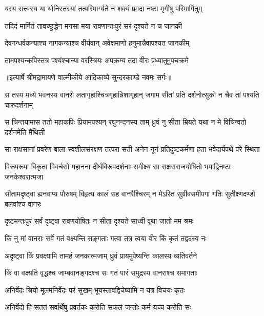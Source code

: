 \twolineshloka
{यस्य सत्त्वस्य या योनिस्तस्यां तत्परिमार्ग्यते}
{न शक्यं प्रमदा नष्टा मृगीषु परिमार्गितुम्} %

\twolineshloka
{तदिदं मार्गितं तावच्छुद्धेन मनसा मया}
{रावणान्तःपुरं सरं दृश्यते न च जानकी} %

\twolineshloka
{देवगन्धर्वकन्याश्च नागकन्याश्च वीर्यवान्}
{अवेक्षमाणो हनुमान्नैवापश्यत जानकीम्} %

\twolineshloka
{तामपश्यन्कपिस्तत्र पश्यंश्चान्या वरस्त्रियः}
{अपक्रम्य तदा वीरः प्रध्यातुमुपचक्रमे} %


{॥इत्यार्षे श्रीमद्रामायणे वाल्मीकीये आदिकाव्ये सुन्दरकाण्डे नवमः सर्गः॥}


\fourlineindentedshloka
{स तस्य मध्ये भवनस्य वानरो}
{लतागृहांश्चित्रगृहान्निशागृहान्}
{जगाम सीतां प्रति दर्शनोत्सुको}
{न चैव तां पश्यति चारुदर्शनाम्} %

\fourlineindentedshloka
{स चिन्तयामास ततो महाकपिः}
{प्रियामपश्यन् रघुनन्दनस्य ताम्}
{ध्रुवं नु सीता म्रियते यथा न मे}
{विचिन्वतो दर्शनमेति मैथिली} %

\fourlineindentedshloka
{सा राक्षसानां प्रवरेण बाला}
{स्वशीलसंरक्षण तत्परा सती}
{अनेन नूनं प्रतिदुष्टकर्मणा}
{हता भवेदार्यपथे परे स्थिता} %

\fourlineindentedshloka
{विरूपरूपा विकृता विवर्चसो}
{महानना दीर्घविरूपदर्शनाः}
{समीक्ष्य सा राक्षसराजयोषितो}
{भयाद्विनष्टा जनकेश्वरात्मजा} %

\fourlineindentedshloka
{सीतामदृष्ट्वा ह्यनवाप्य पौरुषम्}
{विहृत्य कालं सह वानरैश्चिरम्}
{न मेऽस्ति सुग्रीवसमीपगा गतिः}
{सुतीक्ष्णदण्डो बलवांश्च वानरः} %

\twolineshloka
{दृष्टमन्तःपुरं सर्वं दृष्ट्वा रावणयोषितः}
{न सीता दृश्यते साध्वी वृथा जातो मम श्रमः} %

\twolineshloka
{किं नु मां वानराः सर्वे गतं वक्ष्यन्ति सङ्गताः}
{गत्वा तत्र त्वया वीर किं कृतं तद्वदस्व नः} %

\twolineshloka
{अदृष्ट्वा किं प्रवक्ष्यामि तामहं जनकात्मजाम्}
{ध्रुवं प्रायमुपेष्यन्ति कालस्य व्यतिवर्तने} %

\twolineshloka
{किं वा वक्ष्यति वृद्धश्च जाम्बवानङ्गदश्च सः}
{गतं पारं समुद्रस्य वानराश्च समागताः} %

\twolineshloka
{अनिर्वेदः श्रियो मूलमनिर्वेदः परं सुखम्}
{भूयस्तावद्विचेष्यामि न यत्र विचयः कृतः} %

\twolineshloka
{अनिर्वेदो हि सततं सर्वार्थेषु प्रवर्तकः}
{करोति सफलं जन्तोः कर्म यच्च करोति सः} %

